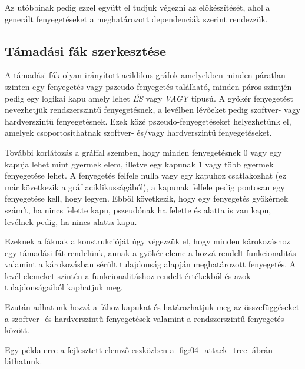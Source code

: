 Az utóbbinak pedig ezzel együtt el tudjuk végezni az előkészítését, ahol a generált fenyegetéseket a meghatározott dependenciák szerint rendezzük.

\subsection{Támadási fák szerkesztése}

A támadási fák olyan irányított aciklikus gráfok amelyekben minden páratlan szinten egy fenyegetés vagy pszeudo-fenyegetés található, minden páros szintjén pedig egy logikai kapu amely lehet \textit{ÉS} vagy \textit{VAGY} típusú. A gyökér fenyegetést nevezhetjük rendszerszintű fenyegetésnek, a levélben lévőeket pedig szoftver- vagy hardverszintű fenyegetésnek. Ezek közé pszeudo-fenyegetéseket helyezhetünk el, amelyek csoportosíthatnak szoftver- és/vagy hardverszintű fenyegetéseket. 

További korlátozás a gráffal szemben, hogy minden fenyegetésnek 0 vagy egy kapuja lehet mint gyermek elem, illetve egy kapunak 1 vagy több gyermek fenyegetése lehet. A fenyegetés felfele nulla vagy egy kapuhoz csatlakozhat (ez már következik a gráf aciklikusságából), a kapunak felfele pedig pontosan egy fenyegetése kell, hogy legyen. Ebből következik, hogy egy fenyegetés gyökérnek számít, ha nincs felette kapu, pszeudónak ha felette és alatta is van kapu, levélnek pedig, ha nincs alatta kapu.

Ezeknek a fáknak a konstrukcióját úgy végezzük el, hogy minden károkozáshoz egy támadási fát rendelünk, annak a gyökér eleme a hozzá rendelt funkcionalitás valamint a károkozásban sérült tulajdonság alapján meghatározott fenyegetés. A levél elemeket szintén a funkcionalitáshoz rendelt értékekből és azok tulajdonságaiból kaphatjuk meg.

Ezután adhatunk hozzá a fához kapukat és határozhatjuk meg az összefüggéseket a szoftver- és hardverszintű fenyegetések valamint a rendszerszintű fenyegetés között.

Egy példa erre a fejlesztett elemző eszközben a \ref{fig:04_attack_tree} ábrán láthatunk.

